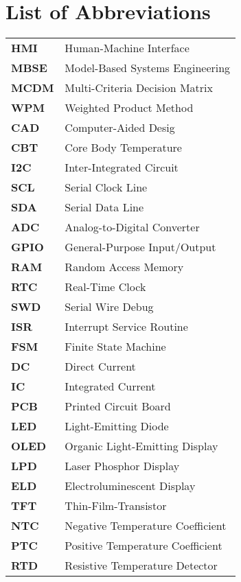 \chapter*{List of Abbreviations}

\begin{table}[H]
	\begin{tabular}{ll}
		\textbf{\Large HMI} & \large Human-Machine Interface\\
		\textbf{\Large MBSE} & \large Model-Based Systems Engineering\\
		\textbf{\Large MCDM} & \large Multi-Criteria Decision Matrix\\
		\textbf{\Large WPM} & \large Weighted Product Method\\
		\textbf{\Large CAD} & \large Computer-Aided Desig\\
		\textbf{\Large CBT} & \large Core Body Temperature\\
		\textbf{\Large I2C} & \large Inter-Integrated Circuit\\
		\textbf{\Large SCL} & \large Serial Clock Line\\
		\textbf{\Large SDA} & \large Serial Data Line\\
		\textbf{\Large ADC} & \large Analog-to-Digital Converter\\
		\textbf{\Large GPIO} & \large General-Purpose Input/Output\\
		\textbf{\Large RAM} & \large Random Access Memory\\
		\textbf{\Large RTC} & \large Real-Time Clock\\
		\textbf{\Large SWD} & \large Serial Wire Debug\\
		\textbf{\Large ISR} & \large Interrupt Service Routine\\
		\textbf{\Large FSM} & \large Finite State Machine\\
		\textbf{\Large DC} & \large Direct Current\\
		\textbf{\Large IC} & \large Integrated Current\\
		\textbf{\Large PCB} & \large Printed Circuit Board\\
		\textbf{\Large LED} & \large Light-Emitting Diode\\
		\textbf{\Large OLED} & \large Organic Light-Emitting Display\\
		\textbf{\Large LPD} & \large Laser Phosphor Display\\
		\textbf{\Large ELD} & \large Electroluminescent Display\\
		\textbf{\Large TFT} & \large Thin-Film-Transistor\\
		\textbf{\Large NTC} & \large Negative Temperature Coefficient\\
		\textbf{\Large PTC} & \large Positive Temperature Coefficient\\
		\textbf{\Large RTD} & \large Resistive Temperature Detector\\
	\end{tabular}
\end{table}
